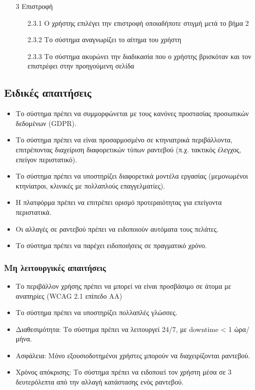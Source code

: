 \documentclass[12pt,a4paper,twoside]{book}
\begin{document}
\begin{enumerate}
  \item[3 ] Επιστροφή
        \begin{enumerate}
          \item[2.3.1 ] Ο χρήστης επιλέγει την επιστροφή οποιαδήποτε στιγμή μετά το βήμα 2 %
          \item[2.3.2 ] Το σύστημα αναγνωρίζει το αίτημα του χρήστη %
          \item[2.3.3 ] Το σύστημα ακυρώνει την διαδικασία που ο χρήστης βρισκόταν και τον επιστρέφει στην προηγούμενη σελίδα %
        \end{enumerate}
\end{enumerate}

\subsection{Ειδικές απαιτήσεις} %
\begin{itemize}
  \item Το σύστημα πρέπει να συμμορφώνεται με τους κανόνες προστασίας προσωπικών δεδομένων (GDPR). %
  \item Το σύστημα πρέπει να είναι προσαρμοσμένο σε κτηνιατρικά περιβάλλοντα, επιτρέποντας διαχείριση διαφορετικών τύπων ραντεβού (π.χ. τακτικός έλεγχος, επείγον περιστατικό). %
  \item Το σύστημα πρέπει να υποστηρίζει διαφορετικά μοντέλα εργασίας (μεμονωμένοι κτηνίατροι, κλινικές με πολλαπλούς επαγγελματίες). %
  \item Η πλατφόρμα πρέπει να επιτρέπει ορισμό προτεραιότητας για επείγοντα περιστατικά.
  \item Οι αλλαγές σε ραντεβού πρέπει να ειδοποιούν αυτόματα τους πελάτες. %
  \item Το σύστημα πρέπει να παρέχει ειδοποιήσεις σε πραγματικό χρόνο. %
\end{itemize}

\subsubsection{Μη λειτουργικές απαιτήσεις}
\begin{itemize}
  \item Το περιβάλλον χρήσης πρέπει να μπορεί να  είναι προσβάσιμο σε  άτομα με αναπηρίες (WCAG 2.1 επίπεδο AA) %
  \item Το σύστημα πρέπει να υποστηρίζει πολλαπλές γλώσσες.
  \item Διαθεσιμότητα: Το σύστημα πρέπει να λειτουργεί 24/7, με downtime < 1 ώρα/μήνα.
  \item Ασφάλεια: Μόνο εξουσιοδοτημένοι χρήστες μπορούν να διαχειρίζονται ραντεβού. %
  \item Χρόνος απόκρισης: Το σύστημα πρέπει να ειδοποιεί τον χρήστη μέσα σε 3 δευτερόλεπτα από την αλλαγή κατάστασης ενός ραντεβού. %
\end{itemize}
\end{document}
